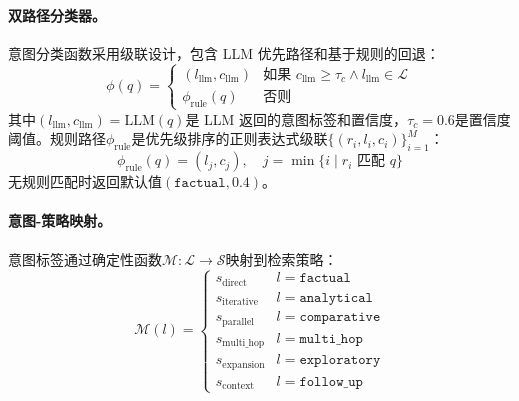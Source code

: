 \documentclass[runningheads]{llncs}
\begin{document}
\paragraph{双路径分类器。}
意图分类函数采用级联设计，包含 LLM 优先路径和基于规则的回退：
\begin{equation}
    \phi(q) = \begin{cases}
    (l_{\text{llm}}, c_{\text{llm}}) & \text{如果 } c_{\text{llm}} \geq \tau_c \wedge l_{\text{llm}} \in \mathcal{L} \\
    \phi_{\text{rule}}(q) & \text{否则}
    \end{cases}
\end{equation}
其中$(l_{\text{llm}}, c_{\text{llm}}) = \text{LLM}(q)$是 LLM 返回的意图标签和置信度，$\tau_c = 0.6$是置信度阈值。规则路径$\phi_{\text{rule}}$是优先级排序的正则表达式级联$\{(r_i, l_i, c_i)\}_{i=1}^{M}$：
\begin{equation}
    \phi_{\text{rule}}(q) = (l_j, c_j), \quad j = \min\{i \mid r_i \text{ 匹配 } q\}
\end{equation}
无规则匹配时返回默认值$(\texttt{factual}, 0.4)$。

\paragraph{意图-策略映射。}
意图标签通过确定性函数$\mathcal{M}: \mathcal{L} \to \mathcal{S}$映射到检索策略：
\begin{equation}
    \mathcal{M}(l) = \begin{cases}
    s_{\text{direct}} & l = \texttt{factual} \\
    s_{\text{iterative}} & l = \texttt{analytical} \\
    s_{\text{parallel}} & l = \texttt{comparative} \\
    s_{\text{multi\_hop}} & l = \texttt{multi\_hop} \\
    s_{\text{expansion}} & l = \texttt{exploratory} \\
    s_{\text{context}} & l = \texttt{follow\_up}
    \end{cases}
\end{equation}
\end{document}
